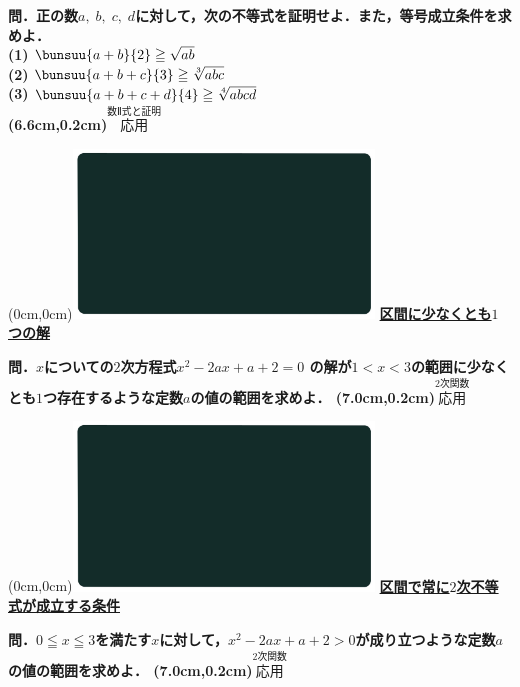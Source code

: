 \documentclass[10pt,
fleqn,
dvipdfmx,
uplatex
]{jsarticle}
\begin{document}
\large 
\bf\boldmath 問．正の数$a,\;b,\;c,\;d$に対して，次の不等式を証明せよ．また，等号成立条件を求めよ．\\
(1)  $\bunsuu{{a+b}}{2}\geqq \sqrt {ab}$\\
(2)  $\bunsuu{{a+b+c}}{3}\geqq \sqrt[3]{abc}$\\
(3)  $\bunsuu{{a+b+c+d}}{4}\geqq \sqrt[4]{abcd}$\\

\at(6.6cm,0.2cm){\small\color{bradorange}$\overset{\text{数Ⅱ式と証明}}{\text{応用}}$}


\newpage



\at(0cm,0cm){\includegraphics[width=8cm,bb=0 0 1920 1080]{./youtube/thumbnails/templates/smart_background/黒板風.jpeg}}
{\color{orange}\bf\boldmath\LARGE\underline{区間に少なくとも$1$つの解}}\vspace{0.3zw}

\Large 
\bf\boldmath 問．$x$についての$2$次方程式$x^2-2ax+a+2=0$
の解が$1<x<3$の範囲に少なくとも$1$つ存在するような定数$a$の値の範囲を求めよ．
\at(7.0cm,0.2cm){\small\color{bradorange}$\overset{\text{2次関数}}{\text{応用}}$}


\newpage



\at(0cm,0cm){\includegraphics[width=8cm,bb=0 0 1920 1080]{./youtube/thumbnails/templates/smart_background/黒板風.jpeg}}
{\color{orange}\bf\boldmath\large\underline{区間で常に$2$次不等式が成立する条件}}\vspace{0.3zw}

\LARGE 
\bf\boldmath 問．$0\leqq x\leqq 3$を満たす$x$に対して，$x^2-2ax+a+2>0$が成り立つような定数$a$の値の範囲を求めよ．
\at(7.0cm,0.2cm){\small\color{bradorange}$\overset{\text{2次関数}}{\text{応用}}$}
\end{document}
